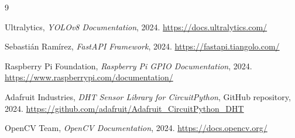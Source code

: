 \documentclass[a4paper,12pt]{report}
\begin{document}
\newpage
\begin{thebibliography}{9}

Ultralytics, 
\textit{YOLOv8 Documentation}, 
2024.
\url{https://docs.ultralytics.com/}

Sebastián Ramírez, 
\textit{FastAPI Framework}, 
2024.
\url{https://fastapi.tiangolo.com/}

Raspberry Pi Foundation, 
\textit{Raspberry Pi GPIO Documentation}, 
2024.
\url{https://www.raspberrypi.com/documentation/}

Adafruit Industries, 
\textit{DHT Sensor Library for CircuitPython}, 
GitHub repository,
2024.
\url{https://github.com/adafruit/Adafruit_CircuitPython_DHT}

OpenCV Team, 
\textit{OpenCV Documentation}, 
2024.
\url{https://docs.opencv.org/}

\end{thebibliography}
\end{document}
